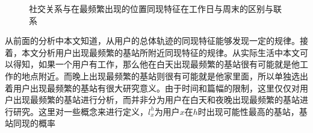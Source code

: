 \begin{figure}[!ht]
    \centering
    \hspace{7em} %
    \caption{社交关系与在最频繁出现的位置同现特征在工作日与周末的区别与联系}
    \label{fig-spatialhomoMost}
\end{figure}


从前面的分析中本文知道，从用户的总体轨迹的同现特征能够发现一定的规律。接着，本文分析用户出现最频繁的基站所附近同现特征的规律。从实际生活中本文可以得知，如果一个用户有工作，那么他在白天出现最频繁的基站很有可能就是他工作的地点附近。而晚上出现最频繁的基站则很有可能就是他家里面，所以单独选出着用户出现最频繁的基站有很大研究意义。由于时间和篇幅的限制，这里仅仅对用户出现最频繁的基站进行分析，而并非分为用户在白天和夜晚出现最频繁的基站进行研究。这里对一些概念来进行定义，$l_x^h$为用户$x$在$h$时出现可能性最高的基站，基站同现的概率


